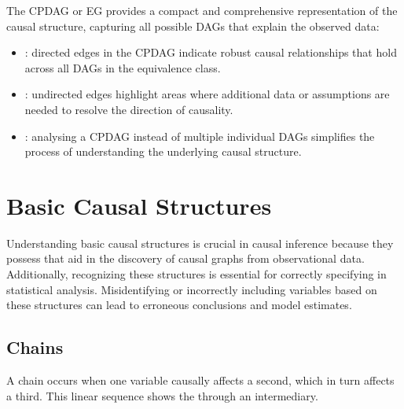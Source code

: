 \documentclass[letterpaper,10pt,english]{jupyterBook}
\begin{document}
\sphinxAtStartPar
The CPDAG or EG provides a compact and comprehensive representation of the causal structure, capturing all possible DAGs that explain the observed data:
\begin{itemize}
\item {} 
\sphinxAtStartPar
{}: directed edges in the CPDAG indicate robust causal relationships that hold across all DAGs in the equivalence class.

\item {} 
\sphinxAtStartPar
{}: undirected edges highlight areas where additional data or assumptions are needed to resolve the direction of causality.

\item {} 
\sphinxAtStartPar
{}: analysing a CPDAG instead of multiple individual DAGs simplifies the process of understanding the underlying causal structure.

\end{itemize}

\sphinxstepscope


\chapter{Basic Causal Structures}
\label{\detokenize{notebooks/basic_dag_structures:basic-causal-structures}}\label{\detokenize{notebooks/basic_dag_structures::doc}}
\sphinxAtStartPar
Understanding basic causal structures is crucial in causal inference because they possess  that aid in the discovery of causal graphs from observational data. Additionally, recognizing these structures is essential for correctly specifying  in statistical analysis. Misidentifying or incorrectly including variables based on these structures can lead to erroneous conclusions and model estimates.


\section{Chains}
\label{\detokenize{notebooks/basic_dag_structures:chains}}
\sphinxAtStartPar
A chain occurs when one variable causally affects a second, which in turn affects a third. This linear sequence shows the  through an intermediary.
\end{document}
